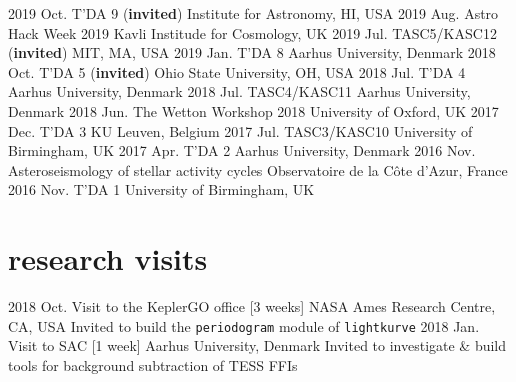 \documentclass[]{k-cv} %
\begin{document}
\begin{entrylist}
\entrythree
{2019 Oct.}
{T'DA 9 (\textbf{invited})}
{Institute for Astronomy, HI, USA}
\entrythree
{2019 Aug.}
{Astro Hack Week 2019}
{Kavli Institude for Cosmology, UK}
\entrythree
{2019 Jul.}
{TASC5/KASC12  (\textbf{invited})}
{MIT, MA, USA}
\entrythree
{2019 Jan.}
{T'DA 8}
{Aarhus University, Denmark}
\entrythree
{2018 Oct.}
{T'DA 5 (\textbf{invited})}
{Ohio State University, OH, USA}
\entrythree
{2018 Jul.}
{T'DA 4}
{Aarhus University, Denmark}
\entrythree
{2018 Jul.}
{TASC4/KASC11}
{Aarhus University, Denmark}
\entrythree
{2018 Jun.}
{The Wetton Workshop 2018}
{University of Oxford, UK}
\entrythree
{2017 Dec.}
{T'DA 3}
{KU Leuven, Belgium}
\entrythree
{2017 Jul.}
{TASC3/KASC10}
{University of Birmingham, UK}
\entrythree
{2017 Apr.}
{T'DA 2}
{Aarhus University, Denmark}
\entrythree
{2016 Nov.}
{Asteroseismology of stellar activity cycles}
{Observatoire de la C\^{o}te d'Azur, France}
\entrythree
{2016 Nov.}
{T'DA 1}
{University of Birmingham, UK}
\end{entrylist}


\section{research visits}
\begin{entrylist}
\entry
{2018 Oct.}
{Visit to the KeplerGO office [3 weeks]}
{NASA Ames Research Centre, CA, USA}
{Invited to build the \texttt{periodogram} module of \texttt{lightkurve}}
\entry
{2018 Jan.}
{Visit to SAC [1 week]}
{Aarhus University, Denmark}
{Invited to investigate \& build tools for background subtraction of TESS FFIs}
\end{entrylist}
\end{document}
